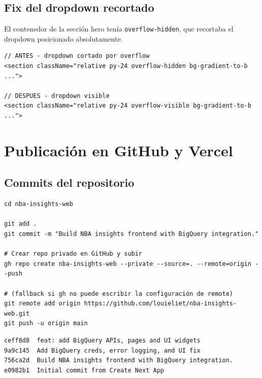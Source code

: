 \documentclass[12pt, letterpaper]{article}
\begin{document}
\subsection{Fix del dropdown recortado}

El contenedor de la sección hero tenía \texttt{overflow-hidden}, que recortaba el dropdown posicionado absolutamente.

\begin{lstlisting}[style=codestyle, caption={Fix: cambio de \texttt{overflow-hidden} a \texttt{overflow-visible} en el hero section}]
// ANTES - dropdown cortado por overflow
<section className="relative py-24 overflow-hidden bg-gradient-to-b ...">

// DESPUES - dropdown visible
<section className="relative py-24 overflow-visible bg-gradient-to-b ...">
\end{lstlisting}

\section{Publicación en GitHub y Vercel}

\subsection{Commits del repositorio}

\begin{lstlisting}[style=codestyle, caption={Creación del repositorio privado y push a GitHub}]
cd nba-insights-web

git add .
git commit -m "Build NBA insights frontend with BigQuery integration."

# Crear repo privado en GitHub y subir
gh repo create nba-insights-web --private --source=. --remote=origin --push

# (fallback si gh no puede escribir la configuración de remote)
git remote add origin https://github.com/louieliet/nba-insights-web.git
git push -u origin main
\end{lstlisting}

\begin{lstlisting}[style=outputstyle, caption={Evidencia --- \texttt{git log --oneline} del repositorio}]
ceff8d8  feat: add BigQuery APIs, pages and UI widgets
9a9c145  Add BigQuery creds, error logging, and UI fix
756ca2d  Build NBA insights frontend with BigQuery integration.
e0982b1  Initial commit from Create Next App
\end{lstlisting}
\end{document}

